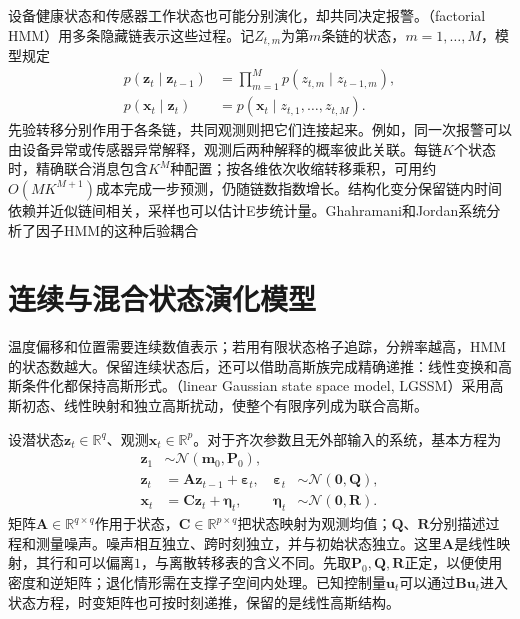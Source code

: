 设备健康状态和传感器工作状态也可能分别演化，却共同决定报警。（factorial HMM）用多条隐藏链表示这些过程。记$Z_{t,m}$为第$m$条链的状态，$m=1,\ldots,M$，模型规定
\begin{equation}
  \begin{aligned}
    p(\bm{z}_t\mid\bm{z}_{t-1})
      &=\prod_{m=1}^{M}
        p(z_{t,m}\mid z_{t-1,m}),\\
    p(\bm{x}_t\mid\bm{z}_t)
      &=p(\bm{x}_t\mid z_{t,1},\ldots,z_{t,M}).
  \end{aligned}
  \label{eq:pgm-dynamic-factorial}
\end{equation}
先验转移分别作用于各条链，共同观测则把它们连接起来。例如，同一次报警可以由设备异常或传感器异常解释，观测后两种解释的概率彼此关联。每链$K$个状态时，精确联合消息包含$K^M$种配置；按各维依次收缩转移乘积，可用约$O(MK^{M+1})$成本完成一步预测，仍随链数指数增长。结构化变分保留链内时间依赖并近似链间相关，采样也可以估计E步统计量。Ghahramani和Jordan系统分析了因子HMM的这种后验耦合

\section{连续与混合状态演化模型}
\label{sec:pgm-dynamic-continuous}

温度偏移和位置需要连续数值表示；若用有限状态格子追踪，分辨率越高，HMM的状态数越大。保留连续状态后，还可以借助高斯族完成精确递推：线性变换和高斯条件化都保持高斯形式。（linear Gaussian state space model, LGSSM）采用高斯初态、线性映射和独立高斯扰动，使整个有限序列成为联合高斯。

设潜状态$\bm{z}_t\in\mathbb{R}^{q}$、观测$\bm{x}_t\in\mathbb{R}^{p}$。对于齐次参数且无外部输入的系统，基本方程为
\begin{equation}
  \begin{aligned}
    \bm{z}_1&\sim\mathcal{N}(\bm{m}_0,\bm{P}_0),\\
    \bm{z}_t&=\bm{A}\bm{z}_{t-1}+\bm{\varepsilon}_t,
      &\bm{\varepsilon}_t&\sim\mathcal{N}(\bm{0},\bm{Q}),\\
    \bm{x}_t&=\bm{C}\bm{z}_t+\bm{\eta}_t,
      &\bm{\eta}_t&\sim\mathcal{N}(\bm{0},\bm{R}).
  \end{aligned}
  \label{eq:pgm-dynamic-lgssm}
\end{equation}
矩阵$\bm{A}\in\mathbb{R}^{q\times q}$作用于状态，$\bm{C}\in\mathbb{R}^{p\times q}$把状态映射为观测均值；$\bm{Q}$、$\bm{R}$分别描述过程和测量噪声。噪声相互独立、跨时刻独立，并与初始状态独立。这里$\bm{A}$是线性映射，其行和可以偏离$1$，与离散转移表的含义不同。先取$\bm{P}_0,\bm{Q},\bm{R}$正定，以便使用密度和逆矩阵；退化情形需在支撑子空间内处理。已知控制量$\bm{u}_t$可以通过$\bm{B}\bm{u}_t$进入状态方程，时变矩阵也可按时刻递推，保留的是线性高斯结构。

